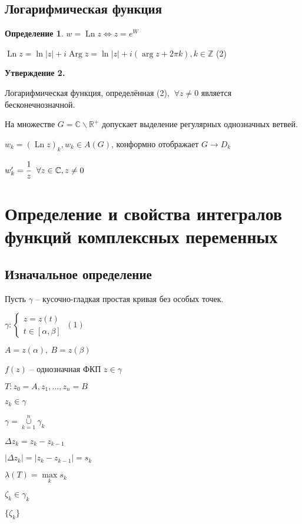 \documentclass[draft]{article}
\newcommand{\R}{\mathbb{R}}
\newcommand{\Z}{\mathbb{Z}}
\renewcommand{\C}{\mathbb{C}}
\newcommand{\LRA}{\Leftrightarrow}
\newcommand{\Ln}{\mathop{\mathrm{Ln}}\nolimits}
\newcommand{\Arg}{\mathop{\mathrm{Arg}}\nolimits}
\renewcommand{\a}{\alpha}
\renewcommand{\b}{\beta}
\newcommand{\g}{\gamma}
\renewcommand{\l}{\lambda}
\newcommand{\D}{\Delta}
\newcommand{\F}{\ \forall}
\newcommand{\sys}[1]{\left\{\begin{matrix}#1\end{matrix}\right.}
\newcommand{\opr}[1]{\begin{opred}#1\end{opred}}
\newtheorem*{opred}{Определение}
\theoremstyle{remark}
\begin{document}
\subsection{Логарифмическая функция}

\opr{$w=\Ln z \LRA z=e^W$}

$\Ln z=\ln|z|+i\Arg z=\ln |z|+i(\arg z+2\pi k), k\in\Z$ (2)

{\bfseries Утверждение 2.}

Логарифмическая функция, определённая (2), $\F z\neq0$ является бесконечнозначной.

На множестве $G=\C\smallsetminus\R^+$ допускает выделение регулярных однозначных ветвей.

$w_k=(\Ln z)_k, w_k\in A(G)$, конформно отображает $G\to D_k$

$w_k'=\cfrac 1z\ \F z\in\C, z\neq0$


\newpage

\section{Определение и свойства интегралов функций комплексных переменных}

\subsection{Изначальное определение}

Пусть $\g$ -- кусочно-гладкая простая кривая без особых точек.

$\g\colon\sys{z=z(t)\\t\in[\a,\b]}\ (1)$

$A=z(\a),\ B=z(\b)$

$f(z)$ -- однозначная ФКП $z\in\g$

$T\colon z_0=A,z_1,\ldots,z_n=B$

$z_k\in\g$

$\g=\overset{n}{\underset{k=1}{\cup}}\g_k$

$\D z_k=z_k-z_{k-1}$

$|\D z_k|=|z_k-z_{k-1}|=s_k$

$\l(T)=\underset{k}{\max}s_k$

$\zeta_k\in\g_k$

$\{\zeta_k\}$
\end{document}
